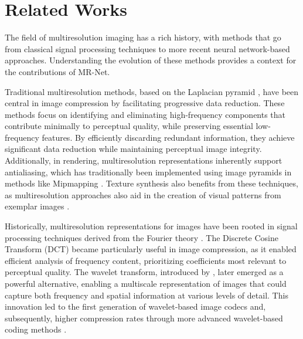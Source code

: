 


\section{Related Works}

The field of multiresolution imaging has a rich history, with methods that go from classical signal processing techniques to more recent neural network-based approaches. Understanding the evolution of these methods provides a context for the contributions of MR-Net.

Traditional multiresolution methods, based on the Laplacian pyramid \citep{burt1987laplacian}, have been central in image compression by facilitating progressive data reduction. These methods focus on identifying and eliminating high-frequency components that contribute minimally to perceptual quality, while preserving essential low-frequency features. By efficiently discarding redundant information, they achieve significant data reduction while maintaining perceptual image integrity. Additionally, in rendering, multiresolution representations inherently support antialiasing, which has traditionally been implemented using image pyramids in methods like Mipmapping \citep{mipmap83}. Texture synthesis also benefits from these techniques, as multiresolution approaches also aid in the creation of visual patterns from exemplar images \citep{thies19}.


Historically, multiresolution representations for images have been rooted in signal processing techniques derived from the Fourier theory \citep{bracewell1986fourier}. The Discrete Cosine Transform (DCT) \citep{dct-og} became particularly useful in image compression, as it enabled efficient analysis of frequency content, prioritizing coefficients most relevant to perceptual quality. The wavelet transform, introduced by \citet{mallat1989theory}, later emerged as a powerful alternative, enabling a multiscale representation of images that could capture both frequency and spatial information at various levels of detail. This innovation led to the first generation of wavelet-based image codecs \citep{antonini1992image} and, subsequently, higher compression rates through more advanced wavelet-based coding methods \citep{mallat-2gen}.

